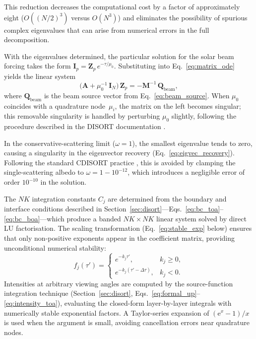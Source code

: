 \documentclass[a4paper, 11pt]{article}
\begin{document}
This reduction decreases the computational cost by a factor of
approximately eight ($O((N/2)^3)$ versus $O(N^3)$) and eliminates the
possibility of spurious complex eigenvalues that can arise from
numerical errors in the full decomposition.

With the eigenvalues determined, the particular solution for the solar
beam forcing takes the form
$\mathbf{I}_p = \mathbf{Z}_p\,e^{-\tau/\mu_0}$.  Substituting into
Eq.~\eqref{eq:matrix_ode} yields the linear system
%
\begin{equation}
  \bigl(\mathbf{A} + \mu_0^{-1}\,\mathbf{I}_N\bigr)\,\mathbf{Z}_p
  = -\mathbf{M}^{-1}\,\mathbf{Q}_{\text{beam}},
  \label{eq:particular_system}
\end{equation}
%
where $\mathbf{Q}_{\text{beam}}$ is the beam source vector from
Eq.~\eqref{eq:beam_source}.  When $\mu_0$ coincides with a quadrature
node~$\mu_i$, the matrix on the left becomes singular; this removable
singularity is handled by perturbing $\mu_0$ slightly, following the
procedure described in the DISORT documentation \cite{disortreport}.

In the conservative-scattering limit ($\omega = 1$), the smallest
eigenvalue tends to zero, causing a singularity in the eigenvector
recovery (Eq.~\ref{eq:eigvec_recovery}).  Following the standard
CDISORT practice \cite{disortreport}, this is avoided by clamping the
single-scattering albedo to $\omega = 1 - 10^{-12}$, which introduces
a negligible error of order $10^{-10}$ in the solution.

The $NK$ integration constants $C_j$ are determined from the boundary
and interface conditions described in
Section~\ref{sec:disort}---Eqs.~\eqref{eq:bc_toa}--\eqref{eq:bc_boa}---which
produce a banded $NK \times NK$ linear system solved by direct LU
factorisation.  The scaling transformation
(Eq.~\ref{eq:stable_exp} below) ensures that only non-positive
exponents appear in the coefficient matrix, providing unconditional
numerical stability:
%
\begin{equation}
  f_j(\tau') = \begin{cases}
    e^{-k_j\tau'}, & k_j \geq 0, \\[4pt]
    e^{-k_j(\tau'-\Delta\tau)}, & k_j < 0.
  \end{cases}
  \label{eq:stable_exp}
\end{equation}
%
Intensities at arbitrary viewing angles are computed by the
source-function integration technique
(Section~\ref{sec:disort},
Eqs.~\ref{eq:formal_up}--\ref{eq:intensity_toa}), evaluating the
closed-form layer-by-layer integrals with numerically stable
exponential factors.  A Taylor-series expansion of
$(\mathrm{e}^x - 1)/x$ is used when the argument is small, avoiding
cancellation errors near quadrature nodes.
\end{document}

